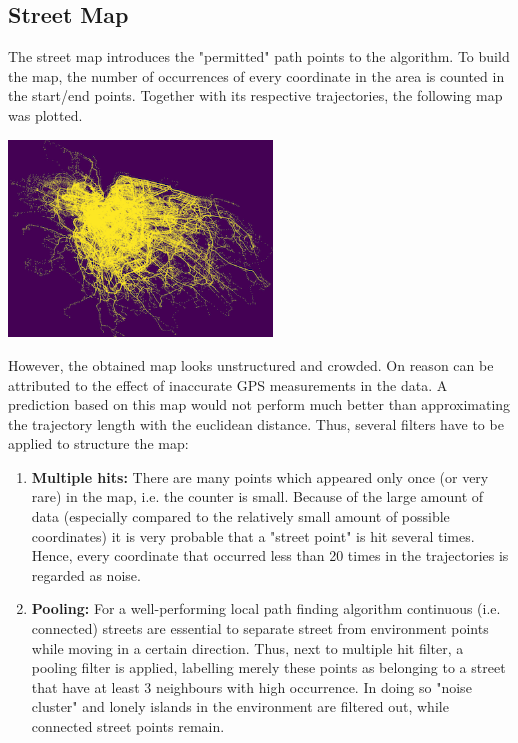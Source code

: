 \documentclass{article}
\newenvironment{Figure}
{\par\medskip\noindent\minipage{\linewidth}}
{\endminipage\par\medskip}
\begin{document}
\begin{multicols}{2}
\subsection{Street Map}
The street map introduces the "permitted" path points to the algorithm. To build the map, the number of occurrences of every coordinate in the area is counted in the start/end points. Together with its respective trajectories, the following map was plotted. 

\begin{Figure}
\begin{center}
\includegraphics[width=7cm]{street_map_overloaded.png}
\end{center}
\label{fig:map-unfiltered}
\end{Figure}

However, the obtained map looks unstructured and crowded. On reason can be attributed to the effect of inaccurate GPS measurements in the data. A prediction based on this map would not perform much better than approximating the trajectory length with the euclidean distance. Thus, several filters have to be applied to structure the map: 

\begin{enumerate}
\item \textbf{Multiple hits:} There are many points which appeared only once (or very rare) in the map, i.e. the counter is small. Because of the large amount of data (especially compared to the relatively small amount of possible coordinates) it is very probable that a "street point" is hit several times. Hence, every coordinate that occurred less than 20 times in the trajectories is regarded as noise. 
\item \textbf{Pooling:} For a well-performing local path finding algorithm continuous (i.e. connected) streets are essential to separate street from environment points while moving in a certain direction. Thus, next to multiple hit filter, a pooling filter is applied, labelling merely these points as belonging to a street that have at least 3 neighbours with high occurrence. In doing so "noise cluster" and lonely islands in the environment are filtered out, while connected street points remain. 
\end{enumerate}


\end{multicols}
\end{document}
